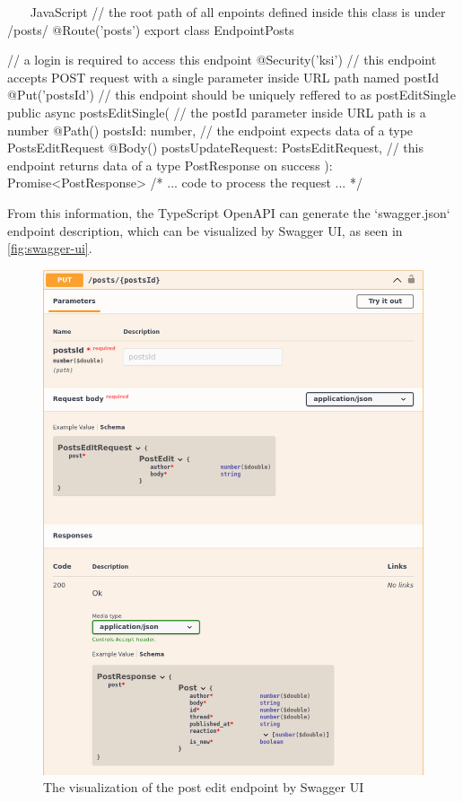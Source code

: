 \documentclass[
  digital, %
  oneside, %
  lof,     %
  nolot,     %
]{fithesis4}
\begin{document}
~~~ JavaScript
// the root path of all enpoints defined inside this class is under /posts/
@Route('posts')
export class EndpointPosts {
// a login is required to access this endpoint
    @Security('ksi')
// this endpoint accepts POST request with a single parameter inside \acrshort{URL} path named postId
    @Put('{postsId}')
// this endpoint should be uniquely reffered to as postEditSingle
    public async postsEditSingle(
// the postId parameter inside \acrshort{URL} path is a number
        @Path() postsId: number,
// the endpoint expects data of a type PostsEditRequest 
        @Body() postsUpdateRequest: PostsEditRequest,
// this endpoint returns data of a type PostResponse on success
    ): Promise<PostResponse>
    {  /* ... code to process the request ... */  }
~~~

From this information, the TypeScript OpenAPI can generate the `swagger.json` endpoint description, which can be visualized by Swagger \acrshort{UI}, as seen in \autoref{fig:swagger-ui}.

\begin{figure}
\includegraphics[width=\textwidth]{assets/img/swagger-ui}
\caption{The visualization of the post edit endpoint by Swagger \acrshort{UI}}
\label{fig:swagger-ui}
\end{figure}

}
\end{document}
